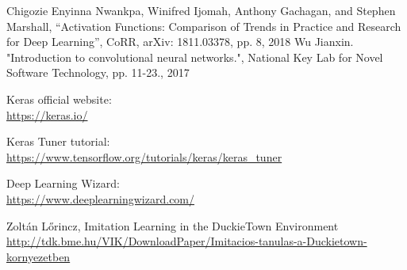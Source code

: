 \documentclass{article}
\begin{document}
\vspace*{1\baselineskip}
Chigozie Enyinna Nwankpa, Winifred Ijomah, Anthony Gachagan, and Stephen Marshall, “Activation Functions: Comparison of Trends in Practice and Research for Deep Learning”, CoRR, arXiv: 1811.03378, pp. 8, 2018
\vspace*{1\baselineskip}
Wu Jianxin. "Introduction to convolutional neural networks.", National Key Lab for Novel Software Technology, pp. 11-23., 2017
\vspace*{1\baselineskip}
\vspace*{1\baselineskip}

Keras official website:
\\
\url{https://keras.io/}
\vspace*{1\baselineskip}

Keras Tuner tutorial:
\\
\url{https://www.tensorflow.org/tutorials/keras/keras_tuner}
\vspace*{1\baselineskip}

Deep Learning Wizard:
\\
\url{https://www.deeplearningwizard.com/}
\vspace*{1\baselineskip}

Zoltán Lőrincz, Imitation Learning in the DuckieTown Environment
\\
\url{http://tdk.bme.hu/VIK/DownloadPaper/Imitacios-tanulas-a-Duckietown-kornyezetben}


\pagebreak

\clearpage
\end{document}
